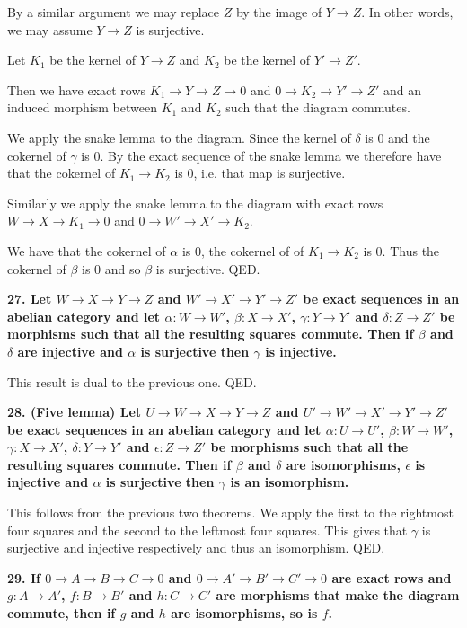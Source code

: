\documentclass[12pt]{article}
\begin{document}
By a similar argument we may replace $Z$ by the image of $Y \to Z$. In other words, we may assume $Y \to Z$ is surjective.

Let $K_1$ be the kernel of $Y \to Z$ and $K_2$ be the kernel of $Y' \to Z'$.

Then we have exact rows $K_1 \to Y \to Z \to 0$ and $0 \to K_2 \to Y' \to Z'$ and an induced morphism between $K_1$ and $K_2$ such that the diagram commutes.

We apply the snake lemma to the diagram. Since the kernel of $\delta$ is $0$ and the cokernel of $\gamma$ is $0$. By the exact sequence of the snake lemma we therefore have that the cokernel of $K_1 \to K_2$ is $0$, i.e. that map is surjective.

Similarly we apply the snake lemma to the diagram with exact rows $W \to X \to K_1 \to 0$ and $0 \to W' \to X' \to K_2$.

We have that the cokernel of $\alpha$ is $0$, the cokernel of of $K_1 \to K_2$ is $0$. Thus the cokernel of $\beta$ is $0$ and so $\beta$ is surjective. QED.

\textbf{27. Let $W \rightarrow X \rightarrow Y \rightarrow Z$ and $W' \rightarrow X' \rightarrow Y' \rightarrow Z'$ be exact sequences in an abelian category and let $\alpha : W \to W'$, $\beta : X \to X'$, $\gamma : Y \to Y'$ and $\delta : Z \to Z'$ be morphisms such that all the resulting squares commute. Then if $\beta$ and $\delta$ are injective and $\alpha$ is surjective then $\gamma$ is injective.}

This result is dual to the previous one. QED.

\textbf{28. (Five lemma) Let $U \rightarrow W \rightarrow X \rightarrow Y \rightarrow Z$ and $U' \rightarrow W' \rightarrow X' \rightarrow Y' \rightarrow Z'$ be exact sequences in an abelian category and let $\alpha : U \to U'$, $\beta : W \to W'$, $\gamma : X \to X'$, $\delta : Y \to Y'$ and $\epsilon : Z \to Z'$ be morphisms such that all the resulting squares commute. Then if $\beta$ and $\delta$ are isomorphisms, $\epsilon$ is injective and $\alpha$ is surjective then $\gamma$ is an isomorphism.}

This follows from the previous two theorems. We apply the first to the rightmost four squares and the second to the leftmost four squares. This gives that $\gamma$ is surjective and injective respectively and thus an isomorphism. QED.

\textbf{29. If $0 \rightarrow A \rightarrow B \rightarrow C \rightarrow 0$ and $0 \rightarrow A' \rightarrow B' \rightarrow C' \rightarrow 0$ are exact rows and $g : A \to A'$, $f : B \to B'$ and $h : C \to C'$ are morphisms that make the diagram commute, then if $g$ and $h$ are isomorphisms, so is $f$.}
\end{document}

